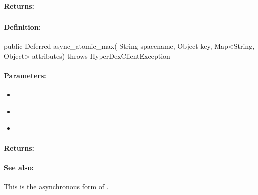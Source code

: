 \paragraph{Returns:}


\pagebreak
\subsubsection{}
\label{api:java:async_atomic_max}


\paragraph{Definition:}
\begin{javacode}
public Deferred async_atomic_max(
        String spacename,
        Object key,
        Map<String, Object> attributes) throws HyperDexClientException
\end{javacode}

\paragraph{Parameters:}
\begin{itemize}[noitemsep]
\item {}\\

\item {}\\

\item {}\\

\end{itemize}

\paragraph{Returns:}


\paragraph{See also:}  This is the asynchronous form of .

\pagebreak
